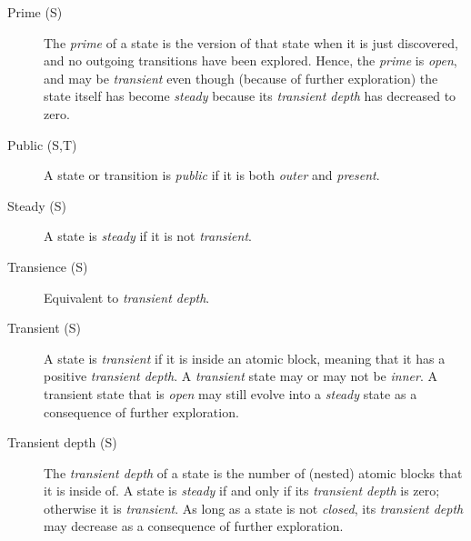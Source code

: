 \documentclass{article}
\begin{document}
\begin{description}
\item[Prime (S)] The \emph{prime} of a state is the version of that state when it is just discovered, and no outgoing transitions have been explored. Hence, the \emph{prime} is \emph{open}, and may be \emph{transient} even though (because of further exploration) the state itself has become \emph{steady} because its \emph{transient depth} has decreased to zero.

\item[Public (S,T)] A state or transition is \emph{public} if it is both \emph{outer} and \emph{present}.

\item[Steady (S)] A state is \emph{steady} if it is not \emph{transient}.

\item[Transience (S)] Equivalent to \emph{transient depth}.

\item[Transient (S)] A state is \emph{transient} if it is inside an atomic block, meaning that it has a positive \emph{transient depth}. A \emph{transient} state may or may not be \emph{inner}. A transient state that is \emph{open} may still evolve into a \emph{steady} state as a consequence of further exploration.

\item[Transient depth (S)] The \emph{transient depth} of a state is the number of (nested) atomic blocks that it is inside of. A state is \emph{steady} if and only if its \emph{transient depth} is zero; otherwise it is \emph{transient}. As long as a state is not \emph{closed}, its \emph{transient depth} may decrease as a consequence of further exploration.
\end{description}
\end{document}
